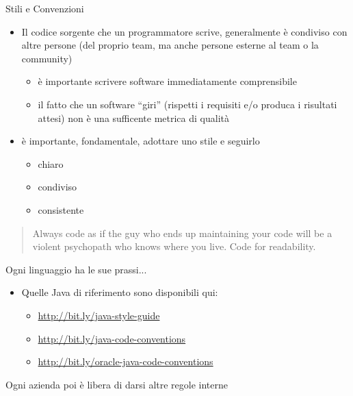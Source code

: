 \documentclass[xcolor=dvipsnames,presentation]{beamer}
\begin{document}
\begin{frame}[allowframebreaks]{Stili e Convenzioni}
	\begin{itemize}\itemsep10pt
		\item Il codice sorgente che un programmatore scrive, generalmente è condiviso con altre persone (del proprio team, ma anche persone esterne al team o la community)
		\begin{itemize}
			\item è importante scrivere software immediatamente comprensibile
			\item il fatto che un software ``giri'' (rispetti i requisiti e/o produca i risultati attesi) non è una sufficente metrica di qualità
		\end{itemize}
		\item è importante, fondamentale, adottare uno stile e seguirlo
		\begin{itemize}
			\item chiaro
			\item condiviso
			\item consistente
		\end{itemize}
	\end{itemize}

\begin{block}{}
\begin{quote}
Always code as if the guy who ends up maintaining your code will be a violent psychopath who knows where you live. Code for readability.
\end{quote}
\end{block}

\begin{block}{Ogni linguaggio ha le sue prassi...}
\begin{itemize}
		\item Quelle Java di riferimento sono disponibili qui:
		\tiny
		\begin{itemize}
			\item \url{http://bit.ly/java-style-guide}
			\item \url{http://bit.ly/java-code-conventions}
			\item \url{http://bit.ly/oracle-java-code-conventions}
		\end{itemize}
	\end{itemize}
\end{block}

\begin{block}{Ogni azienda poi è libera di darsi altre regole interne}


\end{block}
\end{frame}
\end{document}
